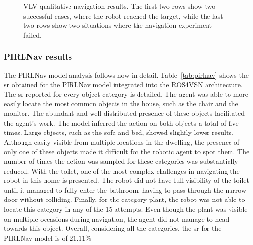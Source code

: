 \begin{figure}[t]
    \centering
    \caption[VLV qualitative navigation results]{VLV qualitative navigation results. The first two rows show two successful cases, where the robot reached the target, while the last two rows show two situations where the navigation experiment failed.}
    \label{fig:vlv_qualitative}
\end{figure}

\subsubsection{PIRLNav results}
\label{subsubsec:pirlnav_results}

The PIRLNav model analysis follows now in detail.
Table~\ref{tab:pirlnav} shows the \acrshort{sr} obtained for the PIRLNav model integrated into the ROS4VSN architecture.
The \acrshort{sr} reported for every object category is detailed.
The agent was able to more easily locate the most common objects in the house, such as the chair and the monitor.
The abundant and well-distributed presence of these objects facilitated the agent's work.
The model inferred the action \stopac on both objects a total of five times.
Large objects, such as the sofa and bed, showed slightly lower results.
Although easily visible from multiple locations in the dwelling, the presence of only one of these objects made it difficult for the robotic agent to spot them.
The number of times the \stopac action was sampled for these categories was substantially reduced.
With the toilet, one of the most complex challenges in navigating the robot in this home is presented.
The robot did not have full visibility of the toilet until it managed to fully enter the bathroom, having to pass through the narrow door without colliding.
Finally, for the category plant, the robot was not able to locate this category in any of the 15 attempts.
Even though the plant was visible on multiple occasions during navigation, the agent did not manage to head towards this object.
Overall, considering all the categories, the \acrshort{sr} for the PIRLNav model is of $21.11\%$.

